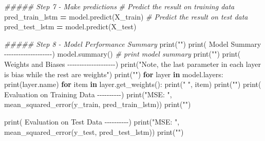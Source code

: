 \documentclass[
  a4paper,
  DIV=11,
  numbers=noendperiod]{scrreprt}
\newenvironment{Shaded}{\begin{snugshade}}{\end{snugshade}}
\newcommand{\BuiltInTok}[1]{#1}
\newcommand{\CommentTok}[1]{\textcolor[rgb]{0.56,0.35,0.01}{\textit{#1}}}
\newcommand{\ControlFlowTok}[1]{\textcolor[rgb]{0.13,0.29,0.53}{\textbf{#1}}}
\newcommand{\KeywordTok}[1]{\textcolor[rgb]{0.13,0.29,0.53}{\textbf{#1}}}
\newcommand{\NormalTok}[1]{#1}
\newcommand{\OperatorTok}[1]{\textcolor[rgb]{0.81,0.36,0.00}{\textbf{#1}}}
\newcommand{\StringTok}[1]{\textcolor[rgb]{0.31,0.60,0.02}{#1}}
\begin{document}
\begin{Shaded}
\begin{Highlighting}[numbers=left,,]
\CommentTok{\#\#\#\#\# Step 7 {-} Make predictions}
\CommentTok{\# Predict the result on training data}
\NormalTok{pred\_train\_lstm }\OperatorTok{=}\NormalTok{ model.predict(X\_train)}
\CommentTok{\# Predict the result on test data}
\NormalTok{pred\_test\_lstm }\OperatorTok{=}\NormalTok{ model.predict(X\_test)}


\CommentTok{\#\#\#\#\# Step 8 {-} Model Performance Summary}
\BuiltInTok{print}\NormalTok{(}\StringTok{""}\NormalTok{)}
\BuiltInTok{print}\NormalTok{(}\StringTok{\textquotesingle{}{-}{-}{-}{-}{-}{-}{-}{-}{-}{-}{-}{-}{-}{-}{-}{-}{-}{-}{-}{-} Model Summary {-}{-}{-}{-}{-}{-}{-}{-}{-}{-}{-}{-}{-}{-}{-}{-}{-}{-}{-}{-}\textquotesingle{}}\NormalTok{)}
\NormalTok{model.summary() }\CommentTok{\# print model summary}
\BuiltInTok{print}\NormalTok{(}\StringTok{""}\NormalTok{)}
\BuiltInTok{print}\NormalTok{(}\StringTok{\textquotesingle{}{-}{-}{-}{-}{-}{-}{-}{-}{-}{-}{-}{-}{-}{-}{-}{-}{-}{-}{-}{-} Weights and Biases {-}{-}{-}{-}{-}{-}{-}{-}{-}{-}{-}{-}{-}{-}{-}{-}{-}{-}{-}{-}\textquotesingle{}}\NormalTok{)}
\BuiltInTok{print}\NormalTok{(}\StringTok{"Note, the last parameter in each layer is bias while the rest are weights"}\NormalTok{)}
\BuiltInTok{print}\NormalTok{(}\StringTok{""}\NormalTok{)}
\ControlFlowTok{for}\NormalTok{ layer }\KeywordTok{in}\NormalTok{ model.layers:}
    \BuiltInTok{print}\NormalTok{(layer.name)}
    \ControlFlowTok{for}\NormalTok{ item }\KeywordTok{in}\NormalTok{ layer.get\_weights():}
        \BuiltInTok{print}\NormalTok{(}\StringTok{"  "}\NormalTok{, item)}
\BuiltInTok{print}\NormalTok{(}\StringTok{""}\NormalTok{)}
\BuiltInTok{print}\NormalTok{(}\StringTok{\textquotesingle{}{-}{-}{-}{-}{-}{-}{-}{-}{-}{-} Evaluation on Training Data {-}{-}{-}{-}{-}{-}{-}{-}{-}{-}\textquotesingle{}}\NormalTok{)}
\BuiltInTok{print}\NormalTok{(}\StringTok{"MSE: "}\NormalTok{, mean\_squared\_error(y\_train, pred\_train\_lstm))}
\BuiltInTok{print}\NormalTok{(}\StringTok{""}\NormalTok{)}

\BuiltInTok{print}\NormalTok{(}\StringTok{\textquotesingle{}{-}{-}{-}{-}{-}{-}{-}{-}{-}{-} Evaluation on Test Data {-}{-}{-}{-}{-}{-}{-}{-}{-}{-}\textquotesingle{}}\NormalTok{)}
\BuiltInTok{print}\NormalTok{(}\StringTok{"MSE: "}\NormalTok{, mean\_squared\_error(y\_test, pred\_test\_lstm))}
\BuiltInTok{print}\NormalTok{(}\StringTok{""}\NormalTok{)}
\end{Highlighting}
\end{Shaded}
\end{document}
